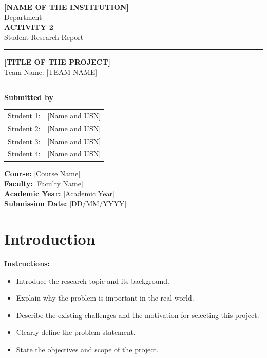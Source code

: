\documentclass[12pt,a4paper]{report}
\begin{document}
\begin{titlepage}
\centering

{\Large \textbf{[NAME OF THE INSTITUTION]}}\\[0.3cm]
{\large Department}\\[1.5cm]

{\Huge \textbf{ACTIVITY 2}}\\[0.4cm]
{\Large Student Research Report}\\[1.2cm]

\hrule
\vspace{0.5cm}

{\LARGE \textbf{[TITLE OF THE PROJECT]}}\\[0.4cm]
{\large Team Name: [TEAM NAME]}

\vspace{0.5cm}
\hrule
\vspace{1cm}

\textbf{Submitted by}\\[0.3cm]

\begin{tabular}{ll}
Student 1: & [Name and USN] \\
Student 2: & [Name and USN] \\
Student 3: & [Name and USN] \\
Student 4: & [Name and USN] \\
\end{tabular}

\vfill

\textbf{Course:} [Course Name]\\
\textbf{Faculty:} [Faculty Name]\\
\textbf{Academic Year:} [Academic Year]\\[0.5cm]

\textbf{Submission Date:} [DD/MM/YYYY]

\end{titlepage}

\tableofcontents
\clearpage
{}

\chapter{Introduction}

\textbf{Instructions:}
\begin{itemize}
    \item Introduce the research topic and its background.
    \item Explain why the problem is important in the real world.
    \item Describe the existing challenges and the motivation
    for selecting this project.
    \item Clearly define the problem statement.
    \item State the objectives and scope of the project.
\end{itemize}
\end{document}
